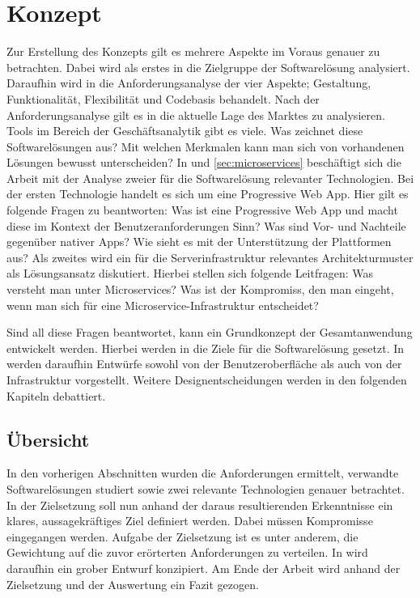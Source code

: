 \chapter{Konzept}
\label{chap:konzept}

Zur Erstellung des Konzepts gilt es mehrere Aspekte im Voraus genauer zu betrachten.
Dabei wird als erstes in  die Zielgruppe der Softwarelösung analysiert. Daraufhin
wird in  die Anforderungsanalyse der vier Aspekte; Gestaltung, Funktionalität,
Flexibilität und Codebasis behandelt. Nach der Anforderungsanalyse gilt es
in  die aktuelle Lage
des Marktes zu analysieren. Tools im Bereich der Geschäftsanalytik gibt es viele. \cite{WikiBISoftware}
Was zeichnet diese Softwarelösungen aus? Mit welchen Merkmalen kann man sich von vorhandenen Lösungen
bewusst unterscheiden? In  und \ref{sec:microservices} beschäftigt
sich die Arbeit mit der Analyse zweier für die Softwarelösung relevanter Technologien.
Bei der ersten Technologie handelt es sich um eine Progressive Web App. Hier gilt es folgende
Fragen zu beantworten: Was ist eine Progressive Web App und macht diese 
im Kontext der Benutzeranforderungen Sinn? Was sind Vor- und Nachteile gegenüber nativer Apps?
Wie sieht es mit der Unterstützung der Plattformen aus? Als zweites wird ein für die
Serverinfrastruktur relevantes Architekturmuster als Lösungsansatz diskutiert. Hierbei
stellen sich folgende Leitfragen: Was versteht man unter Microservices? Was ist der Kompromiss,
den man eingeht, wenn man sich für eine Microservice-Infrastruktur entscheidet?

Sind all diese Fragen beantwortet, kann ein Grundkonzept der Gesamtanwendung entwickelt werden.
Hierbei werden in  die Ziele für die Softwarelösung gesetzt. In 
werden daraufhin Entwürfe sowohl von der Benutzeroberfläche als auch von der Infrastruktur vorgestellt.
Weitere Designentscheidungen werden in den folgenden Kapiteln debattiert.

\section{Übersicht}
\label{sec:uebersicht}
In den vorherigen Abschnitten wurden die Anforderungen ermittelt, verwandte Softwarelösungen
studiert sowie zwei relevante Technologien genauer betrachtet. In der Zielsetzung soll nun
anhand der daraus resultierenden Erkenntnisse ein klares, aussagekräftiges Ziel definiert werden.
Dabei müssen Kompromisse eingegangen werden. Aufgabe der Zielsetzung ist es unter anderem,
die Gewichtung auf die zuvor erörterten Anforderungen zu verteilen. In 
wird daraufhin ein grober Entwurf konzipiert. Am Ende der Arbeit wird anhand der Zielsetzung
und der Auswertung ein Fazit gezogen.

